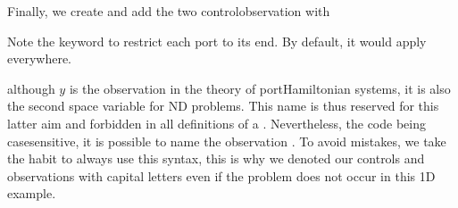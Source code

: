 \documentclass[letterpaper,10pt,english]{sphinxmanual}
\begin{document}
\sphinxAtStartPar
Finally, we create and add the two control\sphinxhyphen{}observation  with

\begin{sphinxVerbatim}[commandchars=\\\{\}]
        
        
\end{sphinxVerbatim}

\sphinxAtStartPar
Note the  keyword  to restrict each port to its end.
By default, it would apply everywhere.

\sphinxAtStartPar
{} although \(y\) is the observation in the theory
of port\sphinxhyphen{}Hamiltonian systems, it is also the second space variable for
N\sphinxhyphen{}D problems. This name is thus reserved for this latter aim and
forbidden in all definitions of a . Nevertheless, the code being
case\sphinxhyphen{}sensitive, it is possible to name the observation . To avoid
mistakes, we take the habit to always use this syntax, this is why we
denoted our controls and observations with capital letters even if the
problem does not occur in this 1D example.
\end{document}
